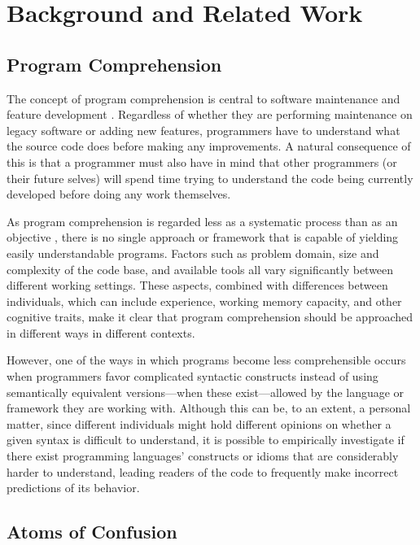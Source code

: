 \section{Background and Related Work}
\label{back}
\subsection{Program Comprehension}

The concept of program comprehension is central to software maintenance and feature development \cite{DBLP:conf/iwpc/TilleySP96}. Regardless of whether they are performing maintenance on legacy software or adding new features, programmers have to understand what the source code does before making any improvements. A natural consequence of this is that a programmer must also have in mind that other programmers (or their future selves) 
will
spend time trying to understand the code being currently developed before doing any work themselves.

As program comprehension is regarded less as a systematic process than as an objective \cite{DBLP:journals/ibmsj/OHareT94}, there is no single approach or framework that is capable of yielding easily understandable programs. Factors such as problem domain, size and complexity of the code base, and available tools all vary significantly between different working settings. These aspects, combined with differences between individuals, which can include experience, working memory capacity, and other cognitive traits, make it clear that program comprehension should be approached in different ways in different contexts. 

However, one of the ways in which programs become less comprehensible occurs when programmers favor complicated syntactic constructs instead of using semantically equivalent versions---when these exist---allowed by the language or framework they are working with. Although this can be, to an extent, a personal matter, since different individuals might hold different opinions on whether a given syntax is difficult to understand, it is possible to empirically investigate if there exist programming languages' constructs or idioms that are considerably harder to understand, leading readers of the code to frequently make incorrect predictions of its behavior. 

\subsection{Atoms of Confusion}\label{sec:aoc}

